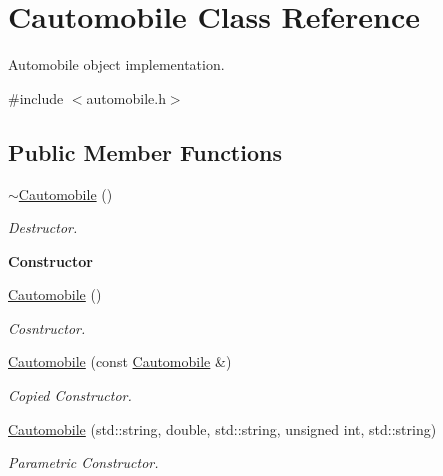 \hypertarget{class_cautomobile}{\section{Cautomobile Class Reference}
\label{class_cautomobile}
}


Automobile object implementation.  




{\ttfamily \#include $<$automobile.\+h$>$}

\subsection*{Public Member Functions}
\begin{DoxyCompactItemize}
\item 
\hypertarget{class_cautomobile_aa3a2ca53356fd2f599afb1dffbdd1473}{\hyperlink{class_cautomobile_aa3a2ca53356fd2f599afb1dffbdd1473}{$\sim$\+Cautomobile} ()}\label{class_cautomobile_aa3a2ca53356fd2f599afb1dffbdd1473}

\begin{DoxyCompactList}\small\item\em Destructor. \end{DoxyCompactList}\end{DoxyCompactItemize}
\begin{Indent}{\bf Constructor}\par
\begin{DoxyCompactItemize}
\item 
\hyperlink{class_cautomobile_abd847a15c21f065b4b6fa00fec9a553a}{Cautomobile} ()
\begin{DoxyCompactList}\small\item\em Cosntructor. \end{DoxyCompactList}\item 
\hyperlink{class_cautomobile_a3dff087e063cba889005398eada539fd}{Cautomobile} (const \hyperlink{class_cautomobile}{Cautomobile} \&)
\begin{DoxyCompactList}\small\item\em Copied Constructor. \end{DoxyCompactList}\item 
\hyperlink{class_cautomobile_a935f9292ea591bf928a1f54914b7057c}{Cautomobile} (std\+::string, double, std\+::string, unsigned int, std\+::string)
\begin{DoxyCompactList}\small\item\em Parametric Constructor. \end{DoxyCompactList}\end{DoxyCompactItemize}
\end{Indent}
